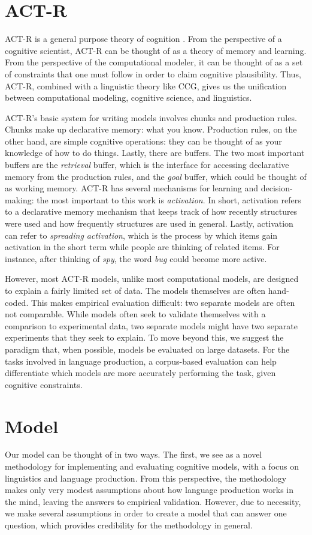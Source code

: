 \section{ACT-R}
ACT-R is a general purpose theory of cognition \citep{actr}. From the perspective of a cognitive scientist, ACT-R can be thought of as a theory of memory and learning. From the perspective of the computational modeler, it can be thought of as a set of constraints that one must follow in order to claim cognitive plausibility. Thus, ACT-R, combined with a linguistic theory like CCG, gives us the unification between computational modeling, cognitive science, and linguistics.

ACT-R's basic system for writing models involves chunks and production rules. Chunks make up declarative memory: what you know. Production rules, on the other hand, are simple cognitive operations: they can be thought of as your knowledge of how to do things. Lastly, there are buffers. The two most important buffers are the \textit{retrieval} buffer, which is the interface for accessing declarative memory from the production rules, and the \textit{goal} buffer, which could be thought of as working memory. ACT-R has several mechanisms for learning and decision-making: the most important to this work is \textit{activation}. In short, activation refers to a declarative memory mechanism that keeps track of how recently structures were used and how frequently structures are used in general. Lastly, activation can refer to \textit{spreading activation}, which is the process by which items gain activation in the short term while people are thinking of related items. For instance, after thinking of \textit{spy}, the word \textit{bug} could become more active.

However, most ACT-R models, unlike most computational models, are designed to explain a fairly limited set of data. The models themselves are often hand-coded. This makes empirical evaluation difficult: two separate models are often not comparable. While models often seek to validate themselves with a comparison to experimental data, two separate models might have two separate experiments that they seek to explain. To move beyond this, we suggest the paradigm that, when possible, models be evaluated on large datasets. For the tasks involved in language production, a corpus-based evaluation can help differentiate which models are more accurately performing the task, given cognitive constraints.


\section{Model}
Our model can be thought of in two ways. The first, we see as a novel methodology for implementing and evaluating cognitive models, with a focus on linguistics and language production. From this perspective, the methodology makes only very modest assumptions about how language production works in the mind, leaving the answers to empirical validation. However, due to necessity, we make several assumptions in order to create a model that can answer one question, which provides credibility for the methodology in general.

